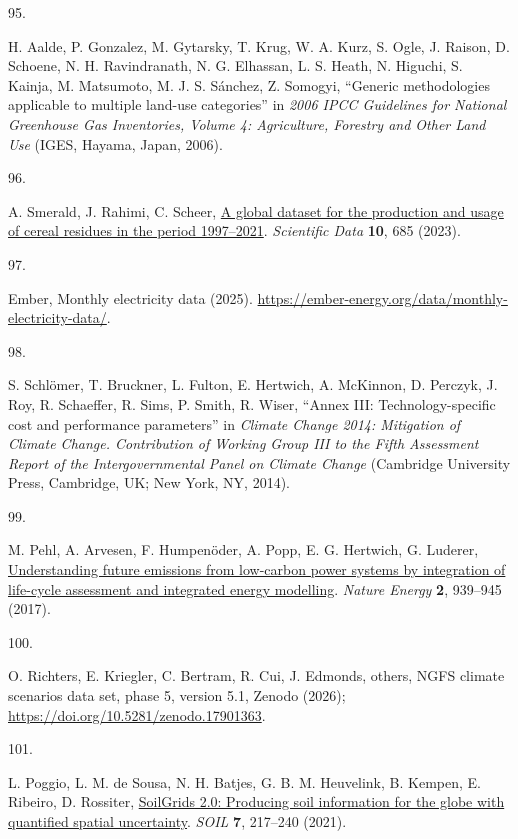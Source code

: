 \documentclass[
  letterpaper,
]{article}
\newlength{\cslhangindent}
\newlength{\csllabelwidth}
\newenvironment{CSLReferences}[2] %
 {\begin{list}{}{%
  \setlength{\itemindent}{0pt}
  \setlength{\leftmargin}{0pt}
  \setlength{\parsep}{0pt}
  \ifodd #1
   \setlength{\leftmargin}{\cslhangindent}
   \setlength{\itemindent}{-1\cslhangindent}
  \fi
  \setlength{\itemsep}{#2\baselineskip}}}
 {\end{list}}
\newcommand{\CSLLeftMargin}[1]{\parbox[t]{\csllabelwidth}{\strut#1\strut}}
\newcommand{\CSLRightInline}[1]{\parbox[t]{\linewidth - \csllabelwidth}{\strut#1\strut}}
\begin{document}
\begin{CSLReferences}{0}{1}
\CSLLeftMargin{95. }%
\CSLRightInline{H. Aalde, P. Gonzalez, M. Gytarsky, T. Krug, W. A. Kurz,
S. Ogle, J. Raison, D. Schoene, N. H. Ravindranath, N. G. Elhassan, L.
S. Heath, N. Higuchi, S. Kainja, M. Matsumoto, M. J. S. Sánchez, Z.
Somogyi, {``Generic methodologies applicable to multiple land-use
categories''} in \emph{2006 {IPCC} Guidelines for National Greenhouse
Gas Inventories, Volume 4: Agriculture, Forestry and Other Land Use}
(IGES, Hayama, Japan, 2006).}

\CSLLeftMargin{96. }%
\CSLRightInline{A. Smerald, J. Rahimi, C. Scheer,
\href{https://doi.org/10.1038/s41597-023-02587-0}{A global dataset for
the production and usage of cereal residues in the period 1997--2021}.
\emph{Scientific Data} \textbf{10}, 685 (2023).}

\CSLLeftMargin{97. }%
\CSLRightInline{Ember, Monthly electricity data (2025).
\url{https://ember-energy.org/data/monthly-electricity-data/}.}

\CSLLeftMargin{98. }%
\CSLRightInline{S. Schlömer, T. Bruckner, L. Fulton, E. Hertwich, A.
McKinnon, D. Perczyk, J. Roy, R. Schaeffer, R. Sims, P. Smith, R. Wiser,
{``Annex {III}: Technology-specific cost and performance parameters''}
in \emph{Climate Change 2014: Mitigation of Climate Change. Contribution
of Working Group {III} to the Fifth Assessment Report of the
Intergovernmental Panel on Climate Change} (Cambridge University Press,
Cambridge, UK; New York, NY, 2014).}

\CSLLeftMargin{99. }%
\CSLRightInline{M. Pehl, A. Arvesen, F. Humpenöder, A. Popp, E. G.
Hertwich, G. Luderer,
\href{https://doi.org/10.1038/s41560-017-0032-9}{Understanding future
emissions from low-carbon power systems by integration of life-cycle
assessment and integrated energy modelling}. \emph{Nature Energy}
\textbf{2}, 939--945 (2017).}

\CSLLeftMargin{100. }%
\CSLRightInline{O. Richters, E. Kriegler, C. Bertram, R. Cui, J.
Edmonds, others, {NGFS} climate scenarios data set, phase 5, version
5.1, Zenodo (2026); \url{https://doi.org/10.5281/zenodo.17901363}.}

\CSLLeftMargin{101. }%
\CSLRightInline{L. Poggio, L. M. de Sousa, N. H. Batjes, G. B. M.
Heuvelink, B. Kempen, E. Ribeiro, D. Rossiter,
\href{https://doi.org/10.5194/soil-7-217-2021}{{SoilGrids} 2.0:
Producing soil information for the globe with quantified spatial
uncertainty}. \emph{SOIL} \textbf{7}, 217--240 (2021).}


\end{CSLReferences}
\end{document}

